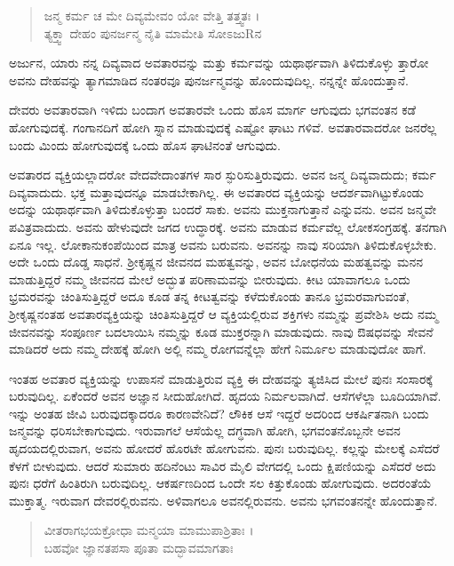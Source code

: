 \begin{verse}
ಜನ್ಮ ಕರ್ಮ ಚ ಮೇ ದಿವ್ಯಮೇವಂ ಯೋ ವೇತ್ತಿ ತತ್ತ್ವತಃ ।\\ತ್ಯಕ್ತ್ವಾ ದೇಹಂ ಪುನರ್ಜನ್ಮ ನೈತಿ ಮಾಮೇತಿ ಸೋಽಜುRನ 
\end{verse}

{\small ಅರ್ಜುನ, ಯಾರು ನನ್ನ ದಿವ್ಯವಾದ ಅವತಾರವನ್ನು ಮತ್ತು ಕರ್ಮವನ್ನು ಯಥಾರ್ಥವಾಗಿ ತಿಳಿದುಕೊಳ್ಳು ತ್ತಾರೋ ಅವನು ದೇಹವನ್ನು ತ್ಯಾಗಮಾಡಿದ ನಂತರವೂ ಪುನರ್ಜನ್ಮವನ್ನು ಹೊಂದುವುದಿಲ್ಲ. ನನ್ನನ್ನೇ ಹೊಂದುತ್ತಾನೆ.}

ದೇವರು ಅವತಾರವಾಗಿ ಇಳಿದು ಬಂದಾಗ ಅವತಾರವೇ ಒಂದು ಹೊಸ ಮಾರ್ಗ ಆಗುವುದು ಭಗವಂತನ ಕಡೆ ಹೋಗುವುದಕ್ಕೆ. ಗಂಗಾನದಿಗೆ ಹೋಗಿ ಸ್ನಾನ ಮಾಡುವುದಕ್ಕೆ ಎಷ್ಟೋ ಘಾಟು ಗಳಿವೆ. ಅವತಾರವಾದರೋ ಜನರೆಲ್ಲ ಬಂದು ಮಿಂದು ಹೋಗುವುದಕ್ಕೆ ಒಂದು ಹೊಸ ಘಾಟಿನಂತೆ ಆಗುವುದು.

ಅವತಾರದ ವ್ಯಕ್ತಿಯಲ್ಲಾದರೋ ವೇದವೇದಾಂತಗಳ ಸಾರ ಸ್ಫುರಿಸುತ್ತಿರುವುದು. ಅವನ ಜನ್ಮ ದಿವ್ಯವಾದುದು; ಕರ್ಮ ದಿವ್ಯವಾದುದು. ಭಕ್ತ ಮತ್ತಾವುದನ್ನೂ ಮಾಡಬೇಕಾಗಿಲ್ಲ. ಈ ಅವತಾರದ ವ್ಯಕ್ತಿಯನ್ನು ಆದರ್ಶವಾಗಿಟ್ಟುಕೊಂಡು ಅದನ್ನು ಯಥಾರ್ಥವಾಗಿ ತಿಳಿದುಕೊಳ್ಳುತ್ತಾ ಬಂದರೆ ಸಾಕು. ಅವನು ಮುಕ್ತನಾಗುತ್ತಾನೆ ಎನ್ನುವನು. ಅವನ ಜನ್ಮವೇ ಪವಿತ್ರವಾದುದು. ಅವನು ಹೇಳುವುದೇ ಜಗದ ಉದ್ಧಾರಕ್ಕೆ. ಅವನು ಮಾಡುವ ಕರ್ಮವೆಲ್ಲ ಲೋಕಸಂಗ್ರಹಕ್ಕೆ. ತನಗಾಗಿ ಏನೂ ಇಲ್ಲ. ಲೋಕಾನುಕಂಪೆಯಿಂದ ಮಾತ್ರ ಅವನು ಬರುವನು. ಅವನನ್ನು ನಾವು ಸರಿಯಾಗಿ ತಿಳಿದುಕೊಳ್ಳಬೇಕು. ಅದೇ ಒಂದು ದೊಡ್ಡ ಸಾಧನೆ. ಶ್ರೀಕೃಷ್ಣನ ಜೀವನದ ಮಹತ್ವವನ್ನು, ಅವನ ಬೋಧನೆಯ ಮಹತ್ವವನ್ನು ಮನನ ಮಾಡುತ್ತಿದ್ದರೆ ನಮ್ಮ ಜೀವನದ ಮೇಲೆ ಅದ್ಭುತ ಪರಿಣಾಮವನ್ನು ಬೀರುವುದು. ಕೀಟ ಯಾವಾಗಲೂ ಒಂದು ಭ್ರಮರವನ್ನು ಚಿಂತಿಸುತ್ತಿದ್ದರೆ ಅದೂ ಕೂಡ ತನ್ನ ಕೀಟತ್ವವನ್ನು ಕಳೆದುಕೊಂಡು ತಾನೂ ಭ್ರಮರವಾಗುವಂತೆ, ಶ್ರೀಕೃಷ್ಣನಂತಹ ಅವತಾರವ್ಯಕ್ತಿಯನ್ನು ಚಿಂತಿಸುತ್ತಿದ್ದರೆ ಆ ವ್ಯಕ್ತಿಯಲ್ಲಿರುವ ಶಕ್ತಿಗಳು ನಮ್ಮನ್ನು ಪ್ರವೇಶಿಸಿ ಅದು ನಮ್ಮ ಜೀವನವನ್ನು ಸಂಪೂರ್ಣ ಬದಲಾಯಿಸಿ ನಮ್ಮನ್ನು ಕೂಡ ಮುಕ್ತರನ್ನಾಗಿ ಮಾಡುವುದು. ನಾವು ಔಷಧವನ್ನು ಸೇವನೆ ಮಾಡಿದರೆ ಅದು ನಮ್ಮ ದೇಹಕ್ಕೆ ಹೋಗಿ ಅಲ್ಲಿ ನಮ್ಮ ರೋಗವನ್ನೆಲ್ಲಾ ಹೇಗೆ ನಿರ್ಮೂಲ ಮಾಡುವುದೋ ಹಾಗೆ.

ಇಂತಹ ಅವತಾರ ವ್ಯಕ್ತಿಯನ್ನು ಉಪಾಸನೆ ಮಾಡುತ್ತಿರುವ ವ್ಯಕ್ತಿ ಈ ದೇಹವನ್ನು ತ್ಯಜಿಸಿದ ಮೇಲೆ ಪುನಃ ಸಂಸಾರಕ್ಕೆ ಬರುವುದಿಲ್ಲ. ಏಕೆಂದರೆ ಅವನ ಅಜ್ಞಾನ ಸೀದುಹೋಗಿದೆ. ಹೃದಯ ನಿರ್ಮಲವಾಗಿದೆ. ಆಸೆಗಳೆಲ್ಲಾ ಬೂದಿಯಾಗಿವೆ. ಇನ್ನು ಅಂತಹ ಜೀವಿ ಬರುವುದಕ್ಕಾದರೂ ಕಾರಣವೇನಿದೆ? ಲೌಕಿಕ ಆಸೆ ಇದ್ದರೆ ಅದರಿಂದ ಆಕರ್ಷಿತನಾಗಿ ಬಂದು ಜನ್ಮವನ್ನು ಧರಿಸಬೇಕಾಗುವುದು. ಇರುವಾಗಲೆ ಆಸೆಯೆಲ್ಲ ದಗ್ಧವಾಗಿ ಹೋಗಿ, ಭಗವಂತನೊಬ್ಬನೇ ಅವನ ಹೃದಯದಲ್ಲಿರುವಾಗ, ಅವನು ಹೋದರೆ ಹೊರಟೇ ಹೋಗುವನು. ಪುನಃ ಬರುವುದಿಲ್ಲ. ಕಲ್ಲನ್ನು ಮೇಲಕ್ಕೆ ಎಸೆದರೆ ಕೆಳಗೆ ಬೀಳುವುದು. ಆದರೆ ಸುಮಾರು ಹದಿನೆಂಟು ಸಾವಿರ ಮೈಲಿ ವೇಗದಲ್ಲಿ ಒಂದು ಕ್ಷಿಪಣಿಯನ್ನು ಎಸೆದರೆ ಅದು ಪುನಃ ಧರೆಗೆ ಹಿಂತಿರುಗಿ ಬರುವುದಿಲ್ಲ. ಆಕರ್ಷಣದಿಂದ ಒಂದೇ ಸಲ ಕಿತ್ತುಕೊಂಡು ಹೋಗುವುದು. ಅದರಂತೆಯೆ ಮುಕ್ತಾತ್ಮ. ಇರುವಾಗ ದೇವರಲ್ಲಿರುವನು. ಅಳಿವಾಗಲೂ ಅವನಲ್ಲಿರುವನು. ಅವನು ಭಗವಂತನನ್ನೇ ಹೊಂದುತ್ತಾನೆ.

\begin{verse}
ವೀತರಾಗಭಯಕ್ರೋಧಾ ಮನ್ಮಯಾ ಮಾಮುಪಾಶ್ರಿತಾಃ ।\\ಬಹವೋ ಜ್ಞಾನತಪಸಾ ಪೂತಾ ಮದ್ಭಾವಮಾಗತಾಃ 
\end{verse}

